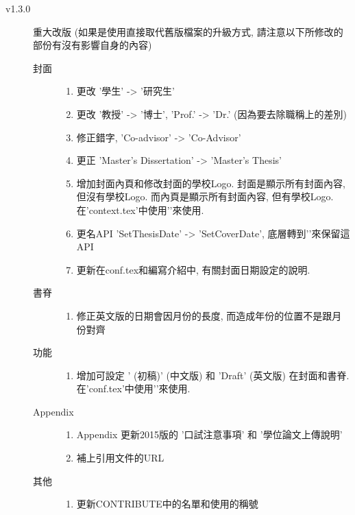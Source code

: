 \begin{description}
  \item[v1.3.0] 重大改版 (如果是使用直接取代舊版檔案的升級方式, 請注意以下所修改的部份有沒有影響自身的內容)\hfill
    \begin{description}
      \item[封面] \hfill
        \begin{enumerate}
          \item 更改 '學生' -> '研究生'
          \item 更改 '教授' -> '博士', 'Prof.' -> 'Dr.' (因為要去除職稱上的差別)
          \item 修正錯字, 'Co-advisor' -> 'Co-Advisor'
          \item 更正 'Master's Dissertation' -> 'Master's Thesis'
          \item 增加封面內頁和修改封面的學校Logo. 封面是顯示所有封面內容, 但沒有學校Logo. 而內頁是顯示所有封面內容, 但有學校Logo. 在'context.tex'中使用'\texttt{\DisplayInsideCover}'來使用.
          \item 更名API 'SetThesisDate' -> 'SetCoverDate', 底層轉到'\SetCoverDate'來保留這API
          \item 更新在conf.tex和編寫介紹中, 有關封面日期設定的說明.
        \end{enumerate}
      \item[書脊] \hfill
        \begin{enumerate}
          \item 修正英文版的日期會因月份的長度, 而造成年份的位置不是跟月份對齊
        \end{enumerate}
      \item[功能] \hfill
        \begin{enumerate}
          \item 增加可設定 ' (初稿)' (中文版) 和 'Draft' (英文版) 在封面和書脊. 在'conf.tex'中使用'\texttt{\DisplayDraft}'來使用.
        \end{enumerate}
      \item[Appendix] \hfill
        \begin{enumerate}
          \item Appendix 更新2015版的 '口試注意事項' 和 '學位論文上傳說明'
          \item 補上引用文件的URL
        \end{enumerate}
      \item[其他] \hfill
        \begin{enumerate}
          \item 更新CONTRIBUTE中的名單和使用的稱號

\end{enumerate}
\end{description}
\end{description}
